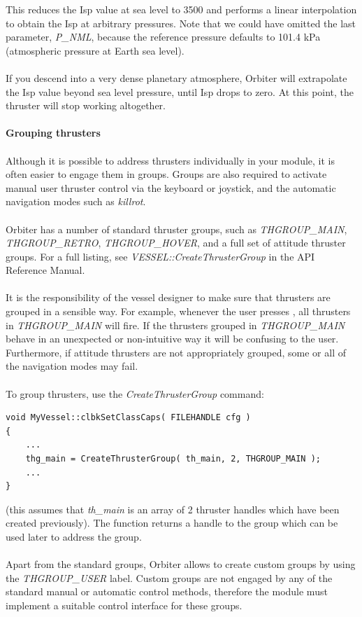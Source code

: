 \documentclass[Orbiter Developer Manual.tex]{subfiles}
\begin{document}
\noindent
This reduces the Isp value at sea level to 3500 and performs a linear interpolation to obtain the Isp at arbitrary pressures. Note that we could have omitted the last parameter, \textit{P\_NML}, because the reference pressure defaults to 101.4 kPa (atmospheric pressure at Earth sea level).\\
\\
If you descend into a very dense planetary atmosphere, Orbiter will extrapolate the Isp value beyond sea level pressure, until Isp drops to zero. At this point, the thruster will stop working altogether.\\
\\
\textbf{Grouping thrusters}\\
\\
Although it is possible to address thrusters individually in your module, it is often easier to engage them in groups. Groups are also required to activate manual user thruster control via the keyboard or joystick, and the automatic navigation modes such as \textit{killrot}.\\
\\
Orbiter has a number of standard thruster groups, such as \textit{THGROUP\_MAIN}, \textit{THGROUP\_RETRO}, \textit{THGROUP\_HOVER}, and a full set of attitude thruster groups. For a full listing, see \textit{VESSEL::\-Create\-Thruster\-Group} in the API Reference Manual.\\
\\
It is the responsibility of the vessel designer to make sure that thrusters are grouped in a sensible way. For example, whenever the user presses \keystroke{+}\num{}, all thrusters in \textit{THGROUP\_MAIN} will fire. If the thrusters grouped in \textit{THGROUP\_MAIN} behave in an unexpected or non-intuitive way it will be confusing to the user. Furthermore, if attitude thrusters are not appropriately grouped, some or all of the navigation modes may fail.\\
\\
To group thrusters, use the \textit{CreateThrusterGroup} command:

\begin{lstlisting}
void MyVessel::clbkSetClassCaps( FILEHANDLE cfg )
{
	...
	thg_main = CreateThrusterGroup( th_main, 2, THGROUP_MAIN );
	...
}
\end{lstlisting}

\noindent
(this assumes that \textit{th\_main} is an array of 2 thruster handles which have been created previously). The function returns a handle to the group which can be used later to address the group.\\
\\
Apart from the standard groups, Orbiter allows to create custom groups by using the \textit{THGROUP\_USER} label. Custom groups are not engaged by any of the standard manual or automatic control methods, therefore the module must implement a suitable control interface for these groups.
\end{document}
